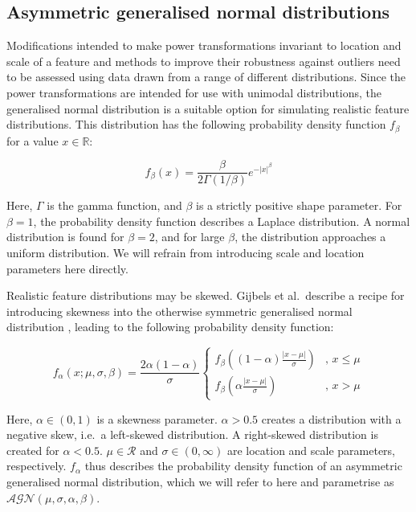 \documentclass[preprint,12pt,authoryear]{elsarticle}
\begin{document}
\subsection{Asymmetric generalised normal
distributions}\label{asymmetric-generalised-normal-distributions}

Modifications intended to make power transformations invariant to
location and scale of a feature and methods to improve their robustness
against outliers need to be assessed using data drawn from a range of
different distributions. Since the power transformations are intended
for use with unimodal distributions, the generalised normal distribution
\citep{Subbotin1923-qk, Nadarajah2005-xe} is a suitable option for simulating
realistic feature distributions. This distribution has the following
probability density function \(f_{\beta}\) for a value
\(x \in \mathbb{R}\):

\begin{equation}
f_{\beta}(x) = \frac{\beta}{2\Gamma\left(1 / \beta \right)} e^{-\left| x \right|^\beta}
\end{equation}

Here, \(\Gamma\) is the gamma function, and \(\beta\) is a strictly
positive shape parameter. For \(\beta = 1\), the probability density
function describes a Laplace distribution. A normal distribution is
found for \(\beta=2\), and for large \(\beta\), the distribution
approaches a uniform distribution. We will refrain from introducing
scale and location parameters here directly.

Realistic feature distributions may be skewed. Gijbels et al.~describe a
recipe for introducing skewness into the otherwise symmetric generalised
normal distribution \citep{Gijbels2019-te}, leading to
the following probability density function:

\begin{equation}
f_{\alpha}(x; \mu, \sigma, \beta) = \frac{2 \alpha \left(1 - \alpha\right)}{\sigma}
\begin{cases}
f_{\beta}\left( \left(1 - \alpha \right) \frac{\left| x - \mu \right|}{\sigma} \right) & \text{, } x \leq \mu \\
f_{\beta}\left( \alpha \frac{\left| x - \mu \right|}{\sigma} \right) & \text{, } x > \mu
\end{cases}
\end{equation}

Here, \(\alpha \in (0,1)\) is a skewness parameter. \(\alpha > 0.5\)
creates a distribution with a negative skew, i.e.~a left-skewed
distribution. A right-skewed distribution is created for
\(\alpha < 0.5\). \(\mu \in \mathcal{R}\) and \(\sigma \in (0, \infty)\)
are location and scale parameters, respectively. \(f_{\alpha}\) thus
describes the probability density function of an asymmetric generalised
normal distribution, which we will refer to here and parametrise as
\(\mathcal{AGN}\left(\mu, \sigma, \alpha, \beta \right)\).
\end{document}
